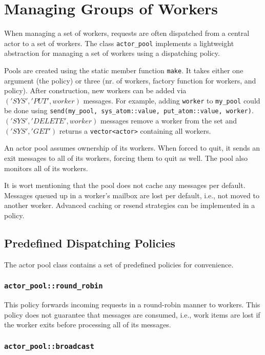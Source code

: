 \section{Managing Groups of Workers}
\label{Sec::WorkerGroups}

When managing a set of workers, requests are often dispatched from a central actor to a set of workers.
The class \lstinline^actor_pool^ implements a lightweight abstraction for managing a set of workers using a dispatching policy.

Pools are created using the static member function \lstinline^make^. It takes either one argument (the policy) or three (nr. of workers, factory function for workers, and policy).
After construction, new workers can be added via $('SYS', 'PUT', worker)$ messages.
For example, adding \lstinline^worker^ to \lstinline^my_pool^ could be done using \lstinline^send(my_pool, sys_atom::value, put_atom::value, worker)^.
$('SYS', 'DELETE', worker)$ messages remove a worker from the set and $('SYS', 'GET')$ returns a \lstinline^vector<actor>^ containing all workers.

An actor pool assumes ownership of its workers.
When forced to quit, it sends an exit messages to all of its workers, forcing them to quit as well.
The pool also monitors all of its workers.

It is wort mentioning that the pool does not cache any messages per default.
Messages queued up in a worker's mailbox are lost per default, i.e., not moved to another worker.
Advanced caching or resend strategies can be implemented in a policy.

\subsection{Predefined Dispatching Policies}

The actor pool class contains a set of predefined policies for convenience.

\subsubsection{\lstinline^actor_pool::round_robin^}

This policy forwards incoming requests in a round-robin manner to workers.
This policy does not guarantee that messages are consumed, i.e., work items are lost if the worker exits before processing all of its messages.

\subsubsection{\lstinline^actor_pool::broadcast^}


